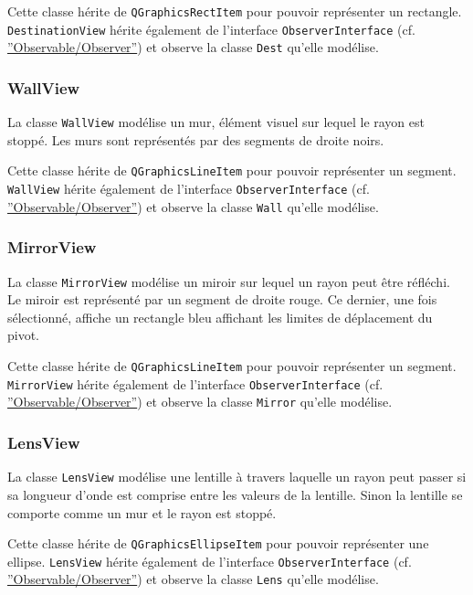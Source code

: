 \documentclass[]{article}
\begin{document}
Cette classe hérite de \texttt{QGraphicsRectItem} pour pouvoir représenter un rectangle.
\texttt{DestinationView} hérite également de l'interface \texttt{ObserverInterface} (cf. \hyperref[OO]{''Observable/Observer''}) et observe
la classe \texttt{Dest} qu'elle modélise.

\subsubsection{\label{WallView}WallView}

La classe \texttt{WallView} modélise un mur, élément visuel sur lequel le rayon est stoppé. 
Les murs sont représentés par des segments de droite noirs.

Cette classe hérite de \texttt{QGraphicsLineItem} pour pouvoir représenter un segment.
\texttt{WallView} hérite également de l'interface \texttt{ObserverInterface} (cf. \hyperref[OO]{''Observable/Observer''}) et observe
la classe \texttt{Wall} qu'elle modélise.

\subsubsection{\label{MirrorView}MirrorView}

La classe \texttt{MirrorView} modélise un miroir sur lequel un rayon peut être réfléchi.
Le miroir est représenté par un segment de droite rouge. Ce dernier, une fois sélectionné, affiche
un rectangle bleu affichant les limites de déplacement du pivot. 

Cette classe hérite de \texttt{QGraphicsLineItem} pour pouvoir représenter un segment.
\texttt{MirrorView} hérite également de l'interface \texttt{ObserverInterface} (cf. \hyperref[OO]{''Observable/Observer''}) et observe
la classe \texttt{Mirror} qu'elle modélise.

\subsubsection{\label{LensView}LensView}

La classe \texttt{LensView} modélise une lentille à travers laquelle un rayon peut passer si sa longueur d’onde est
comprise entre les valeurs de la lentille. Sinon la lentille se comporte comme un mur et le rayon 
est stoppé. 

Cette classe hérite de \texttt{QGraphicsEllipseItem} pour pouvoir représenter une ellipse.
\texttt{LensView} hérite également de l'interface \texttt{ObserverInterface} (cf. \hyperref[OO]{''Observable/Observer''}) et observe
la classe \texttt{Lens} qu'elle modélise.
\end{document}
